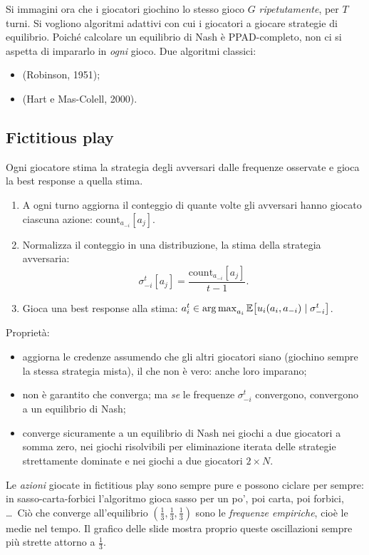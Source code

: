 Si immagini ora che i giocatori giochino lo stesso gioco $G$ \emph{ripetutamente}, per $T$
turni. Si vogliono algoritmi adattivi con cui i giocatori  a giocare strategie
di equilibrio. Poiché calcolare un equilibrio di Nash è PPAD-completo, non ci si aspetta di
impararlo in \emph{ogni} gioco. Due algoritmi classici:
\begin{itemize}
  \item {} (Robinson, 1951);
  \item {} (Hart e Mas-Colell, 2000).
\end{itemize}

\subsection{Fictitious play}

Ogni giocatore stima la strategia degli avversari dalle frequenze osservate e gioca la best
response a quella stima.
\begin{enumerate}
  \item A ogni turno aggiorna il conteggio di quante volte gli avversari hanno giocato
        ciascuna azione: $\text{count}_{a_{-i}}[a_j]$.
  \item Normalizza il conteggio in una distribuzione, la stima della strategia avversaria:
        \[
          \sigma_{-i}^t[a_j] = \frac{\text{count}_{a_{-i}}[a_j]}{t - 1}.
        \]
  \item Gioca una best response alla stima:
        $a_i^t \in \operatorname*{arg\,max}_{a_i} \mathbb{E}\bigl[u_i(a_i, a_{-i}) \mid \sigma_{-i}^t\bigr]$.
\end{enumerate}

Proprietà:
\begin{itemize}
  \item aggiorna le credenze assumendo che gli altri giocatori siano 
        (giochino sempre la stessa strategia mista), il che non è vero: anche loro imparano;
  \item non è garantito che converga; ma \emph{se} le frequenze $\sigma_{-i}^t$ convergono,
        convergono a un equilibrio di Nash;
  \item converge sicuramente a un equilibrio di Nash nei giochi a due giocatori a somma zero,
        nei giochi risolvibili per eliminazione iterata delle strategie strettamente
        dominate e nei giochi a due giocatori $2\times N$.
\end{itemize}

\begin{osservazione}
Le \emph{azioni} giocate in fictitious play sono sempre pure e possono ciclare per sempre:
in sasso-carta-forbici l'algoritmo gioca sasso per un po', poi carta, poi forbici, \ldots\ Ciò
che converge all'equilibrio $(\tfrac13,\tfrac13,\tfrac13)$ sono le \emph{frequenze
empiriche}, cioè le medie nel tempo. Il grafico delle slide mostra proprio queste
oscillazioni sempre più strette attorno a $\tfrac13$.
\end{osservazione}

